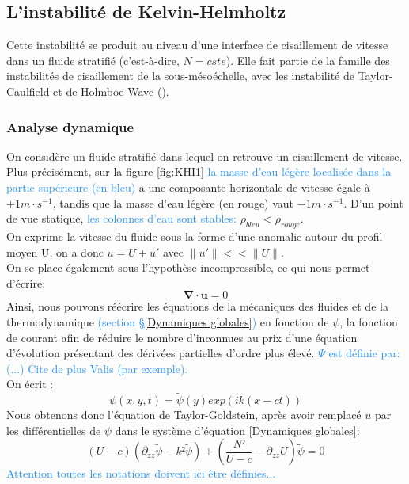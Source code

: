 \documentclass{rapportECC}
\newcommand{\FAadd}[1]{\textcolor{DodgerBlue}{{#1}}}                     %
\begin{document}
\subsection{L'instabilité de Kelvin-Helmholtz}
\label{KHI}

Cette instabilité se produit au niveau d'une interface de cisaillement de vitesse dans un fluide stratifié (c'est-à-dire, $N = cste$). Elle fait partie de la famille des instabilités de cisaillement de la sous-mésoéchelle, avec les instabilité de Taylor-Caulfield et de Holmboe-Wave (\cite{shear_instabilities_2018}).
\\

\subsubsection{Analyse dynamique}

On considère un fluide stratifié dans lequel on retrouve un cisaillement de vitesse. Plus précisément, sur la figure \ref{fig:KHI1} \FAadd{la masse d'eau légère localisée dans la partie supérieure (en bleu)} a une composante horizontale de vitesse égale à $+1 m \cdot s^{-1}$, tandis que la masse d'eau légère (en rouge) vaut $-1 m \cdot s^{-1}$. D'un point de vue statique, \FAadd{les colonnes d'eau sont stables:} $\rho_{bleu} < \rho_{rouge}$. \\
On exprime la vitesse du fluide sous la forme d'une anomalie autour du profil moyen U, on a donc $u = U+u'$ avec $\|u'\|<<\|U\|$. \\
On se place également sous l'hypothèse incompressible, ce qui nous permet d'écrire: 
\begin{equation}
    \mathbf{\nabla} \cdot \mathbf{u} = 0
\end{equation}
Ainsi, nous pouvons réécrire les équations de la mécaniques des fluides et de la thermodynamique \FAadd{(section \S \ref{Dynamiques globales})} en fonction de $\psi$, la fonction de courant afin de réduire le nombre d'inconnues au prix d'une équation d'évolution présentant des dérivées partielles d'ordre plus élevé. \FAadd{$\Psi$ est définie par: (...) Cite de plus Valis (par exemple).}
\\
On écrit :
\begin{equation}
    \psi(x,y,t) = \tilde{\psi}(y)exp(ik(x-ct))
    \label{eq: fct courant}
\end{equation}
Nous obtenons donc l'équation de Taylor-Goldstein, après avoir remplacé $u$ par les différentielles de $\psi$ dans le système d'équation \ref{Dynamiques globales}: \\
\begin{equation}
    (U - c)( \partial_{zz}\tilde{\psi} - k²\tilde{\psi}) + (\frac{N²}{U - c} - \partial_{zz} U)\tilde{\psi} = 0
    \label{eq: taylor goldstein}
\end{equation}
\FAadd{Attention toutes les notations doivent ici être définies...}
\end{document}
